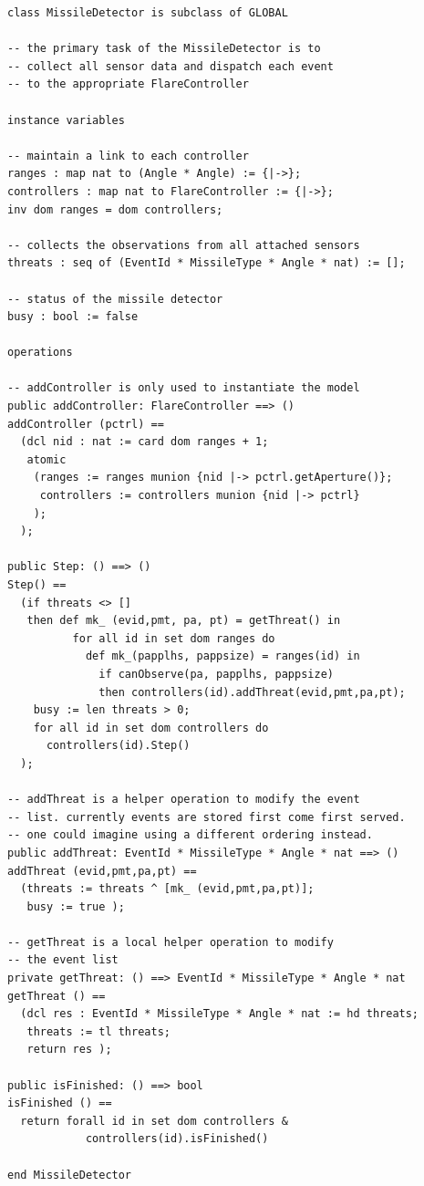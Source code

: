 \documentclass[\pformat,12pt]{jreport}
\begin{document}
\begin{lstlisting}
class MissileDetector is subclass of GLOBAL

-- the primary task of the MissileDetector is to
-- collect all sensor data and dispatch each event
-- to the appropriate FlareController

instance variables

-- maintain a link to each controller
ranges : map nat to (Angle * Angle) := {|->};
controllers : map nat to FlareController := {|->};
inv dom ranges = dom controllers;

-- collects the observations from all attached sensors
threats : seq of (EventId * MissileType * Angle * nat) := [];

-- status of the missile detector
busy : bool := false

operations

-- addController is only used to instantiate the model
public addController: FlareController ==> ()
addController (pctrl) ==
  (dcl nid : nat := card dom ranges + 1;
   atomic
    (ranges := ranges munion {nid |-> pctrl.getAperture()};
     controllers := controllers munion {nid |-> pctrl}
    );
  );

public Step: () ==> ()
Step() ==
  (if threats <> []
   then def mk_ (evid,pmt, pa, pt) = getThreat() in
          for all id in set dom ranges do
            def mk_(papplhs, pappsize) = ranges(id) in
              if canObserve(pa, papplhs, pappsize)
              then controllers(id).addThreat(evid,pmt,pa,pt);
    busy := len threats > 0;
    for all id in set dom controllers do
      controllers(id).Step()
  );
 
-- addThreat is a helper operation to modify the event
-- list. currently events are stored first come first served.
-- one could imagine using a different ordering instead.
public addThreat: EventId * MissileType * Angle * nat ==> ()
addThreat (evid,pmt,pa,pt) == 
  (threats := threats ^ [mk_ (evid,pmt,pa,pt)];
   busy := true );

-- getThreat is a local helper operation to modify 
-- the event list
private getThreat: () ==> EventId * MissileType * Angle * nat
getThreat () ==
  (dcl res : EventId * MissileType * Angle * nat := hd threats;
   threats := tl threats;
   return res );

public isFinished: () ==> bool
isFinished () ==
  return forall id in set dom controllers &
            controllers(id).isFinished()

end MissileDetector
\end{lstlisting}
\end{document}
